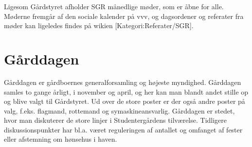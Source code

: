 \documentclass[11pt,article,twoside,openany,danish,extrafontsizes]{memoir} %
\begin{document}
Ligesom Gårdstyret afholder SGR  månedlige møder, som er åbne for alle. Møderne fremgår af den sociale kalender på vvv, og dagsordener og referater fra møder kan ligeledes findes på wikien [Kategori:Referater/SGR].



\section{Gårddagen}
Gårddagen er gårdboernes generalforsamling og højeste myndighed. Gårddagen samles to gange årligt, i november og april, og her kan man blandt andet stille op og blive valgt til Gårdstyret. Ud over de store poster er der også andre poster på valg, f.eks. flagmand, rottemand og symaskineansvarlig. Gårddagen er stedet, hvor man diskuterer de store linjer i Studentergårdens tilværelse. Tidligere diskussionspunkter har bl.a. været reguleringen af antallet og omfanget af fester eller afstemning om hønsehus i haven.


\clearpage
\end{document}
